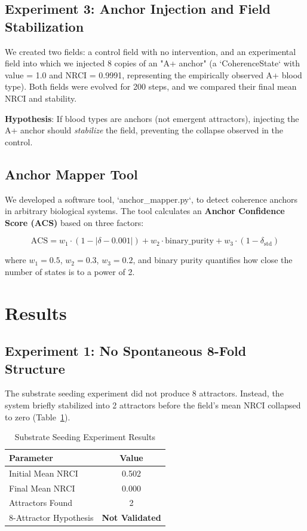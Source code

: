 \documentclass[11pt]{article}
\begin{document}
\subsection{Experiment 3: Anchor Injection and Field Stabilization}

We created two fields: a control field with no intervention, and an experimental field into which we injected 8 copies of an "A+ anchor" (a `CoherenceState` with value = 1.0 and NRCI = 0.9991, representing the empirically observed A+ blood type). Both fields were evolved for 200 steps, and we compared their final mean NRCI and stability.

\textbf{Hypothesis}: If blood types are anchors (not emergent attractors), injecting the A+ anchor should \textit{stabilize} the field, preventing the collapse observed in the control.

\subsection{Anchor Mapper Tool}

We developed a software tool, `anchor_mapper.py`, to detect coherence anchors in arbitrary biological systems. The tool calculates an \textbf{Anchor Confidence Score (ACS)} based on three factors:

\begin{equation}
\text{ACS} = w_1 \cdot (1 - |\delta - 0.001|) + w_2 \cdot \text{binary\_purity} + w_3 \cdot (1 - \delta_{\text{std}})
\end{equation}

where $w_1 = 0.5$, $w_2 = 0.3$, $w_3 = 0.2$, and binary purity quantifies how close the number of states is to a power of 2.

\section{Results}

\subsection{Experiment 1: No Spontaneous 8-Fold Structure}

The substrate seeding experiment did not produce 8 attractors. Instead, the system briefly stabilized into 2 attractors before the field's mean NRCI collapsed to zero (Table~\ref{tab:exp1_summary}).

\begin{table}[h!]
\centering
\caption{Substrate Seeding Experiment Results}
\begin{tabular}{lc}
\toprule
\textbf{Parameter} & \textbf{Value} \\
\midrule
Initial Mean NRCI & 0.502 \\
Final Mean NRCI & 0.000 \\
Attractors Found & 2 \\
8-Attractor Hypothesis & \textbf{Not Validated} \\
\bottomrule
\end{tabular}
\label{tab:exp1_summary}
\end{table}
\end{document}

